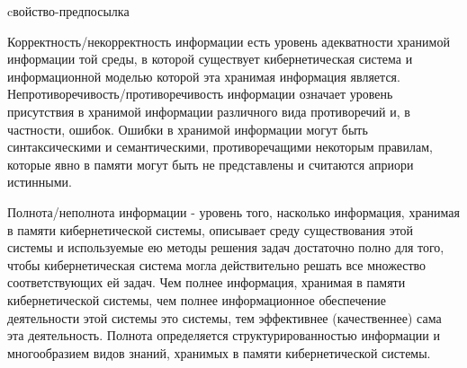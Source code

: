 \begin{SCn}
\begin{scnrelfromlist}{cвойство-предпосылка}
\end{scnrelfromlist}
\end{SCn}

Корректность/некорректность информации есть уровень адекватности хранимой информации той среды, в которой существует кибернетическая система и информационной моделью которой эта хранимая информация является. 
Непротиворечивость/противоречивость информации означает уровень присутствия в хранимой информации различного вида противоречий и, в частности, ошибок. 
Ошибки в хранимой информации могут быть синтаксическими и семантическими, противоречащими некоторым правилам, которые явно в памяти могут быть не представлены и считаются априори истинными.

Полнота/неполнота информации - уровень того, насколько информация, хранимая в памяти кибернетической системы, описывает среду существования этой системы и используемые ею методы решения задач достаточно полно для того, чтобы кибернетическая система могла действительно решать все множество соответствующих ей задач. 
Чем полнее информация, хранимая в памяти кибернетической системы, чем полнее информационное обеспечение деятельности этой системы это системы, тем эффективнее (качественнее) сама эта деятельность. 
Полнота определяется структурированностью информации и многообразием видов знаний, хранимых в памяти кибернетической системы.

